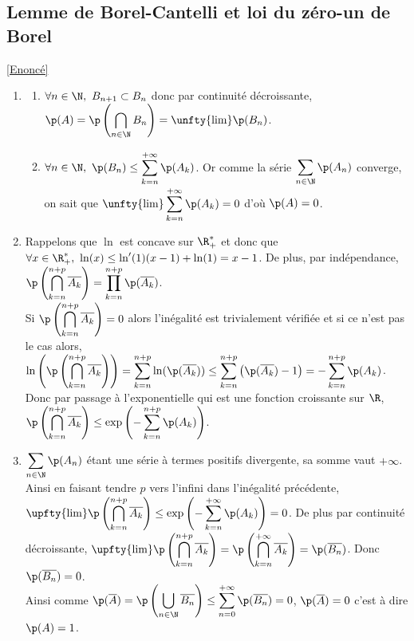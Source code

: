 \documentclass[8pt]{book}
\begin{document}
	\subsection{Lemme de Borel-Cantelli et loi du zéro-un de Borel }
	\label{Lemme de Borel-Cantelli et loi du zéro-un de Borel corrigé}
		\textcolor{blue}{\hyperref[Lemme de Borel-Cantelli et loi du zéro-un de Borel]{[Enoncé]}}\\
	\begin{enumerate}
		\item \begin{enumerate}[label=\alph*.]
			\item $\forall n\in \N,\ B_{n+1}\subset B_n$ donc par continuité décroissante, $\p(A)=\p\left(\displaystyle\bigcap_{n\in\N}B_n\right)=\unfty{\lim}\p(B_n)$.
			\item $\forall n\in \N,\ \p(B_n)\leq \displaystyle\sum\limits_{k=n}^{+\infty}\p(A_k)$. Or comme la série $\displaystyle\sum\limits_{n\in\N}\p(A_n)$ converge, on sait que $\unfty{\lim}\displaystyle\sum\limits_{k=n}^{+\infty}\p(A_k)=0$ d'où $\p(A)=0$.
		\end{enumerate}
		\item Rappelons que $\ln$ est concave sur $\R^*_+$ et donc que $\forall x\in \R^*_+,\ \ln(x)\leq \ln'(1)(x-1)+\ln(1)=x-1$. De plus, par indépendance, $\p\left(\displaystyle\bigcap\limits_{k=n}^{n+p}\overline{A_k}\right)=\displaystyle\prod\limits_{k=n}^{n+p}\p(\overline{A_k})$.\\
		Si $\p\left(\displaystyle\bigcap\limits_{k=n}^{n+p}\overline{A_k}\right)=0$ alors l'inégalité est trivialement vérifiée et si ce n'est pas le cas alors,\\
		$\ln\left(\p\left(\displaystyle\bigcap\limits_{k=n}^{n+p}\overline{A_k}\right)\right)=\displaystyle\sum\limits_{k=n}^{n+p}\ln(\p(\overline{A_k}))\leq\displaystyle\sum\limits_{k=n}^{n+p}\left(\p(\overline{A_k})-1\right)=-\displaystyle\sum\limits_{k=n}^{n+p}\p(A_k)$.\\
		Donc par passage à l'exponentielle qui est une fonction croissante sur $\R$,\\
		$\p\left(\displaystyle\bigcap\limits_{k=n}^{n+p}\overline{A_k}\right)\leq \exp\left(-\displaystyle\sum\limits_{k=n}^{n+p}\p(A_k)\right)$.
		\item $\displaystyle\sum\limits_{n\in\N}\p(A_n)$ étant une série à termes positifs divergente, sa somme vaut $+\infty$. Ainsi en faisant tendre $p$ vers l'infini dans l'inégalité précédente, $\upfty{\lim}\p\left(\displaystyle\bigcap\limits_{k=n}^{n+p}\overline{A_k}\right)\leq \exp\left(-\displaystyle\sum\limits_{k=n}^{+\infty}\p(A_k)\right)=0$. De plus par continuité décroissante, $\upfty{\lim}\p\left(\displaystyle\bigcap\limits_{k=n}^{n+p}\overline{A_k}\right)=\p\left(\displaystyle\bigcap\limits_{k=n}^{+\infty}\overline{A_k}\right)=\p(\overline{B_n})$. Donc $\p(\overline{B_n})=0$.\\
		Ainsi comme $\p(\overline{A})=\p\left(\displaystyle\bigcup\limits_{n\in \N}\overline{B_n}\right)\leq \displaystyle\sum\limits_{n=0}^{+\infty}\p(\overline{B_n})=0$, $\p(\overline{A})=0$ c'est à dire $\p(A)=1$.
	\end{enumerate}
	
\end{document}
